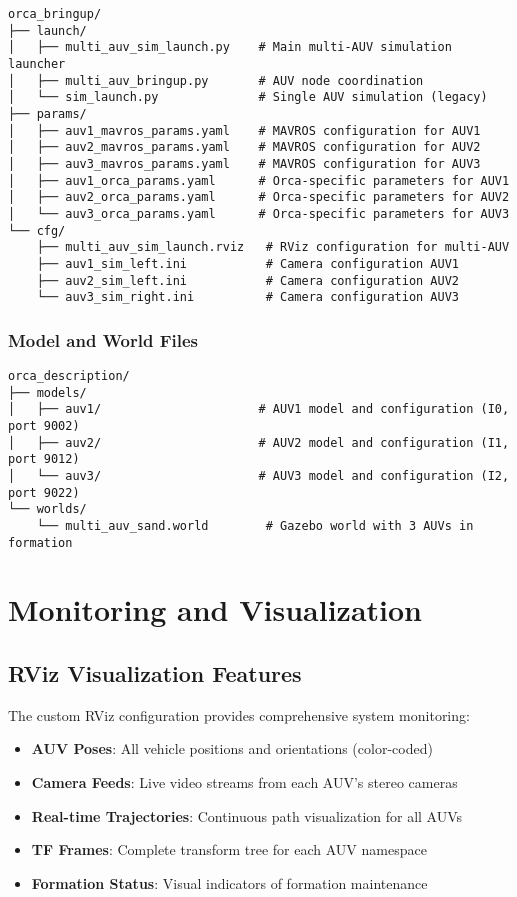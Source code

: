 \documentclass[11pt,a4paper]{article}
\begin{document}
\begin{lstlisting}[caption=Launch System Organization]
orca_bringup/
├── launch/
│   ├── multi_auv_sim_launch.py    # Main multi-AUV simulation launcher
│   ├── multi_auv_bringup.py       # AUV node coordination
│   └── sim_launch.py              # Single AUV simulation (legacy)
├── params/
│   ├── auv1_mavros_params.yaml    # MAVROS configuration for AUV1
│   ├── auv2_mavros_params.yaml    # MAVROS configuration for AUV2
│   ├── auv3_mavros_params.yaml    # MAVROS configuration for AUV3
│   ├── auv1_orca_params.yaml      # Orca-specific parameters for AUV1
│   ├── auv2_orca_params.yaml      # Orca-specific parameters for AUV2
│   └── auv3_orca_params.yaml      # Orca-specific parameters for AUV3
└── cfg/
    ├── multi_auv_sim_launch.rviz   # RViz configuration for multi-AUV
    ├── auv1_sim_left.ini           # Camera configuration AUV1
    ├── auv2_sim_left.ini           # Camera configuration AUV2
    └── auv3_sim_right.ini          # Camera configuration AUV3
\end{lstlisting}

\subsubsection{Model and World Files}

\begin{lstlisting}[caption=Simulation Assets Organization]
orca_description/
├── models/
│   ├── auv1/                      # AUV1 model and configuration (I0, port 9002)
│   ├── auv2/                      # AUV2 model and configuration (I1, port 9012)
│   └── auv3/                      # AUV3 model and configuration (I2, port 9022)
└── worlds/
    └── multi_auv_sand.world        # Gazebo world with 3 AUVs in formation
\end{lstlisting}

\section{Monitoring and Visualization}

\subsection{RViz Visualization Features}

The custom RViz configuration provides comprehensive system monitoring:

\begin{itemize}
    \item \textbf{AUV Poses}: All vehicle positions and orientations (color-coded)
    \item \textbf{Camera Feeds}: Live video streams from each AUV's stereo cameras
    \item \textbf{Real-time Trajectories}: Continuous path visualization for all AUVs
    \item \textbf{TF Frames}: Complete transform tree for each AUV namespace
    \item \textbf{Formation Status}: Visual indicators of formation maintenance
\end{itemize}
\end{document}
